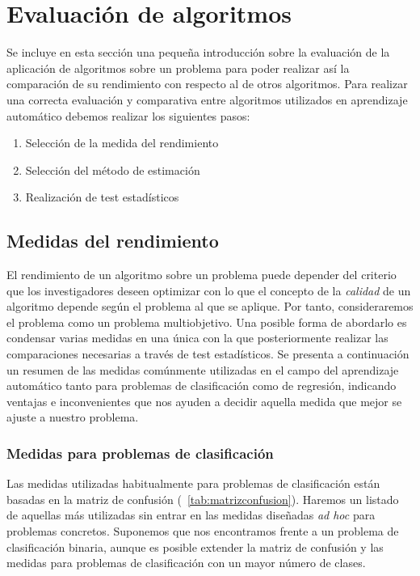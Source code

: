 \section{Evaluación de algoritmos}

	Se incluye en esta sección una pequeña introducción sobre la evaluación de la aplicación de algoritmos sobre un problema para poder realizar así la comparación de su rendimiento con respecto al de otros algoritmos. Para realizar una correcta evaluación y comparativa entre algoritmos utilizados en aprendizaje automático debemos realizar los siguientes pasos:
	
	\begin{enumerate}
		\item Selección de la medida del rendimiento
		\item Selección del método de estimación
		\item Realización de test estadísticos
	\end{enumerate}

\subsection{Medidas del rendimiento}
	
	El rendimiento de un algoritmo sobre un problema puede depender del criterio que los investigadores deseen optimizar con lo que el concepto de la \textit{calidad} de un algoritmo depende según el problema al que se aplique. Por tanto, consideraremos el problema como un problema multiobjetivo. Una posible forma de abordarlo es condensar varias medidas en una única con la que posteriormente realizar las comparaciones necesarias a través de test estadísticos. Se presenta a continuación un resumen de las medidas comúnmente utilizadas en el campo del aprendizaje automático tanto para problemas de clasificación como de regresión, indicando ventajas e inconvenientes que nos ayuden a decidir aquella medida que mejor se ajuste a nuestro problema.
	
\subsubsection*{Medidas para problemas de clasificación}

	Las medidas utilizadas habitualmente para problemas de clasificación están basadas en la matriz de confusión (~\ref{tab:matrizconfusion}). Haremos un listado de aquellas más utilizadas sin entrar en las medidas diseñadas \textit{ad hoc} para problemas concretos. Suponemos que nos encontramos frente a un problema de clasificación binaria, aunque es posible extender la matriz de confusión y las medidas para problemas de clasificación con un mayor número de clases.

